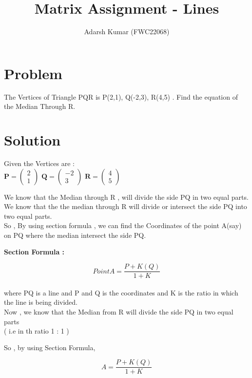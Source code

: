 \documentclass[journal,12pt,twocolumn]{IEEEtran}
\title{\mytitle}
\title{
Matrix Assignment - Lines
}
\author{Adarsh Kumar (FWC22068)}
\newcommand{\myvec}[1]{\ensuremath{\begin{pmatrix}#1\end{pmatrix}}}
\let\vec\mathbf
\begin{document}
\maketitle
\tableofcontents
\bigskip


\section{\textbf{Problem}}
The Vertices of Triangle PQR is P(2,1), Q(-2,3), R(4,5) . Find the equation of the Median Through R.\\


\section{\textbf{Solution}}
Given the Vertices are :\\
\linebreak
$\vec{P} = \myvec{2 \\ 1}$ \hspace{5mm}
$\vec{Q} = \myvec{-2 \\ 3}$ \hspace{5mm}
$\vec{R} = \myvec{4 \\ 5}$ \hspace{5mm}
\linebreak


We know that the Median through R ,
will divide the side PQ in two equal parts.
\\
We know that the the median through R will
divide or intersect the side PQ into two equal parts.
\\
So , By using section formula , we can find the Coordinates of the point A(say) on PQ where the median intersect the side PQ.

\textbf{Section Formula :}

\begin{equation}
 Point A = \frac{P + K(Q)}{1+K}  \label{eq-1}
\end{equation}
\\
where PQ is a line and P and Q is the coordinates and K is the ratio in which the line is being divided.
\\

Now , we know that the Median from R will divide the side PQ in two equal parts 
\\( i.e in th ratio 1 : 1 )

So ,  by using Section Formula,

\begin{equation}
A = \frac{P + K(Q)}{1+K}
\end{equation}
\end{document}
